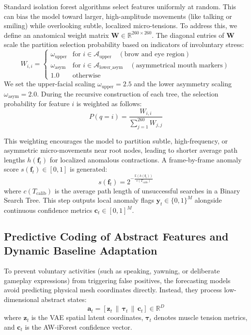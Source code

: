 \documentclass[sigconf]{acmart}
\begin{document}
Standard isolation forest algorithms select features uniformly at random. This can bias the model toward larger, high-amplitude movements (like talking or smiling) while overlooking subtle, localized micro-tensions. To address this, we define an anatomical weight matrix $\mathbf{W} \in \mathbb{R}^{260 \times 260}$. The diagonal entries of $\mathbf{W}$ scale the partition selection probability based on indicators of involuntary stress:
$$W_{i,i} = \begin{cases} 
\omega_{\text{upper}} & \text{for } i \in \mathcal{A}_{\text{upper}} \quad (\text{brow and eye region}) \\
\omega_{\text{asym}} & \text{for } i \in \mathcal{A}_{\text{lower\_asym}} \quad (\text{asymmetrical mouth markers}) \\
1.0 & \text{otherwise}
\end{cases}$$
We set the upper-facial scaling $\omega_{\text{upper}} = 2.5$ and the lower asymmetry scaling $\omega_{\text{asym}} = 2.0$. During the recursive construction of each tree, the selection probability for feature $i$ is weighted as follows:
$$P(q = i) = \frac{W_{i,i}}{\sum_{j=1}^{260} W_{j,j}}$$

This weighting encourages the model to partition subtle, high-frequency, or asymmetric micro-movements near root nodes, leading to shorter average path lengths $h(\mathbf{f}_t)$ for localized anomalous contractions. A frame-by-frame anomaly score $s(\mathbf{f}_t) \in [0, 1]$ is generated:
$$s(\mathbf{f}_t) = 2^{-\frac{\mathbb{E}(h(\mathbf{f}_t))}{c(T_{\text{calib}})}}$$
where $c(T_{\text{calib}})$ is the average path length of unsuccessful searches in a Binary Search Tree. This step outputs local anomaly flags $\mathbf{y}_t \in \{0, 1\}^M$ alongside continuous confidence metrics $\mathbf{c}_t \in [0, 1]^M$.

\subsection{Predictive Coding of Abstract Features and Dynamic Baseline Adaptation}
To prevent voluntary activities (such as speaking, yawning, or deliberate gameplay expressions) from triggering false positives, the forecasting models avoid predicting physical mesh coordinates directly. Instead, they process low-dimensional abstract states:
$$\mathbf{a}_t = [\mathbf{z}_t \,\|\, \boldsymbol{\tau}_t \,\|\, \mathbf{c}_t] \in \mathbb{R}^{D}$$
where $\mathbf{z}_t$ is the VAE spatial latent coordinates, $\boldsymbol{\tau}_t$ denotes muscle tension metrics, and $\mathbf{c}_t$ is the AW-iForest confidence vector.
\end{document}
